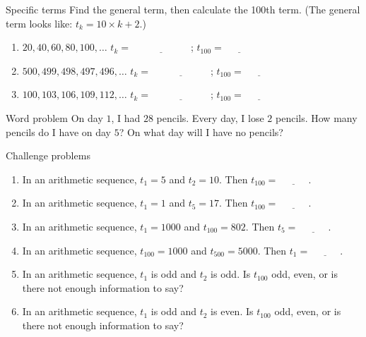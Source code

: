 \documentclass[12pt,letterpaper]{article}
\begin{document}
\begin{problem}{Specific terms}
 Find the general term, then calculate the 100th term. (The general term looks like: $t_k = 10 \times k + 2$.)

\begin{enumerate}[\hspace{.5cm}a.]
\item $20, 40, 60, 80, 100, \ldots$ \hfill $t_k = \underline{\hspace{6em}}$; $t_{100} = \underline{\hspace{3em}}$
\item $500, 499, 498, 497, 496, \ldots$ \hfill $t_k = \underline{\hspace{6em}}$; $t_{100} = \underline{\hspace{3em}}$
\item $100, 103, 106, 109, 112, \ldots$ \hfill $t_k = \underline{\hspace{6em}}$; $t_{100} = \underline{\hspace{3em}}$
\end{enumerate}
\end{problem}

\begin{problem}{Word problem}
 On day $1$, I had $28$ pencils. Every day, I lose $2$ pencils. How many pencils do I have on day $5$?
 On what day will I have no pencils?
\end{problem}

\begin{problem}{Challenge problems}
  \begin{enumerate}[\hspace{.5cm}a.]
  \item In an arithmetic sequence, $t_1 = 5$ and $t_2 = 10$. Then $t_{100} = \underline{\hspace{3em}}$.
  \item In an arithmetic sequence, $t_1 = 1$ and $t_5 = 17$. Then $t_{100} = \underline{\hspace{3em}}$.
  \item In an arithmetic sequence, $t_1 = 1000$ and $t_{100} = 802$. Then $t_{5} = \underline{\hspace{3em}}$.
  \item In an arithmetic sequence, $t_{100} = 1000$ and $t_{500} = 5000$. Then $t_{1} = \underline{\hspace{3em}}$.
  \item In an arithmetic sequence, $t_1$ is odd and $t_2$ is odd.
  Is $t_{100}$ odd, even, or is there not enough information to say?
  \item In an arithmetic sequence, $t_1$ is odd and $t_2$ is even.
  Is $t_{100}$ odd, even, or is there not enough information to say?
  \end{enumerate}
\end{problem}
\end{document}
